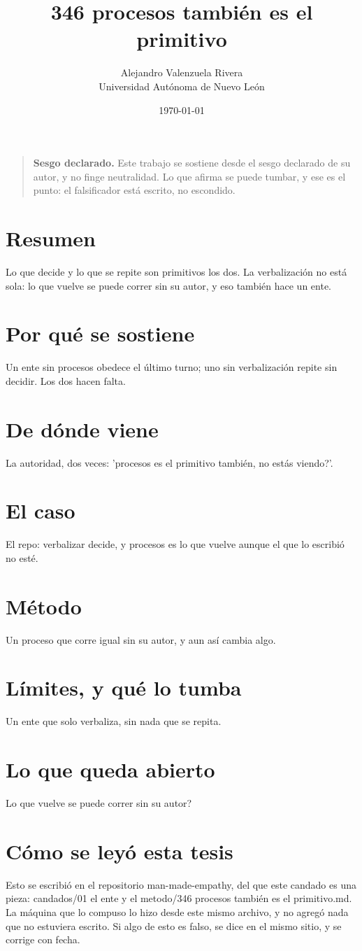 \documentclass[11pt,a4paper]{article}
\title{346 procesos también es el primitivo}
\author{Alejandro Valenzuela Rivera\\\small Universidad Autónoma de Nuevo León}
\date{\today}
\begin{document}
\maketitle

\begin{quote}
\textbf{Sesgo declarado.} Este trabajo se sostiene desde el sesgo declarado de su autor, y no finge neutralidad. Lo que afirma se puede tumbar, y ese es el punto: el falsificador está escrito, no escondido.
\end{quote}

\section*{Resumen}
Lo que decide y lo que se repite son primitivos los dos. La verbalización no está sola: lo que vuelve se puede correr sin su autor, y eso también hace un ente.

\section{Por qué se sostiene}
Un ente sin procesos obedece el último turno; uno sin verbalización repite sin decidir. Los dos hacen falta.

\section{De dónde viene}
La autoridad, dos veces: 'procesos es el primitivo también, \textquestiondown{}no estás viendo?'.

\section{El caso}
El repo: verbalizar decide, y procesos es lo que vuelve aunque el que lo escribió no esté.

\section{Método}
Un proceso que corre igual sin su autor, y aun así cambia algo.

\section{Límites, y qué lo tumba}
Un ente que solo verbaliza, sin nada que se repita.

\section{Lo que queda abierto}
\textquestiondown{}Lo que vuelve se puede correr sin su autor?

\section*{Cómo se leyó esta tesis}
Esto se escribió en el repositorio man-made-empathy, del que este candado es una pieza: candados/01 el ente y el metodo/346 procesos también es el primitivo.md. La máquina que lo compuso lo hizo desde este mismo archivo, y no agregó nada que no estuviera escrito. Si algo de esto es falso, se dice en el mismo sitio, y se corrige con fecha.
\end{document}
